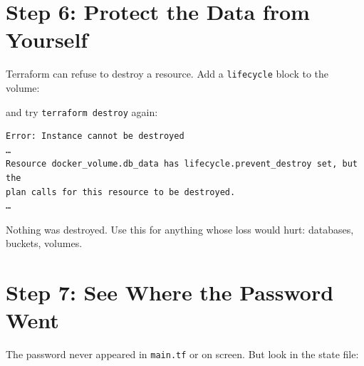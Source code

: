 
\section{Step 6: Protect the Data from Yourself}\label{11-lab-rebuild-everything-from-code:step-6-protect-the-data-from-yourself}

Terraform can refuse to destroy a resource. Add a \texttt{lifecycle} block to the volume:

\begin{codeblock}

\begin{Shaded}
\begin{Highlighting}[]

\NormalTok{  \}}
\NormalTok{\}}
\end{Highlighting}
\end{Shaded}

\end{codeblock}


and try \texttt{terraform\ destroy} again:

\begin{codeblock}
\begin{Verbatim}[formatcom=\outputstyle]
Error: Instance cannot be destroyed
…
Resource docker_volume.db_data has lifecycle.prevent_destroy set, but the
plan calls for this resource to be destroyed.
…
\end{Verbatim}
\end{codeblock}

Nothing was destroyed. Use this for anything whose loss would hurt: databases, buckets, volumes.


\section{Step 7: See Where the Password Went}\label{11-lab-rebuild-everything-from-code:step-7-see-where-the-password-went}

The password never appeared in \texttt{main.tf} or on screen. But look in the state file:

\begin{codeblock}

\begin{Shaded}
\begin{Highlighting}[]
 
\end{Highlighting}
\end{Shaded}

\end{codeblock}

